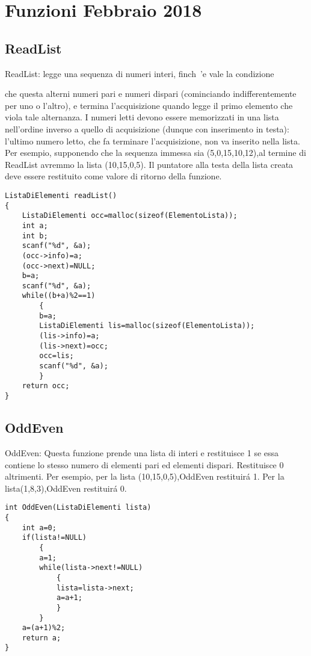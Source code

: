 \documentclass[a4paper,12pt,openany]{book}
\begin{document}
	\chapter{Funzioni Febbraio 2018}
  \section{ReadList}
 ReadList: 
 legge  una  sequenza  di  numeri  interi, 
  finch\ 'e  vale  la  condizione
  
    che  questa  alterni  numeri  pari  e  numeri  dispari  (cominciando indifferentemente per uno o l’altro),  e termina l’acquisizione quando legge il primo elemento che viola tale alternanza.  I numeri letti devono essere memorizzati in una lista nell’ordine inverso a quello di acquisizione (dunque con inserimento in testa):  l’ultimo numero letto, che fa terminare l’acquisizione, non va inserito nella lista. Per esempio, supponendo che la sequenza immessa sia (5,0,15,10,12),al termine di ReadList avremmo la lista (10,15,0,5).
Il  puntatore  alla  testa  della  lista  creata  deve  essere  restituito  come valore di ritorno della funzione.
   \begin{lstlisting}
ListaDiElementi readList()
{
	ListaDiElementi occ=malloc(sizeof(ElementoLista));
	int a;
	int b;
	scanf("%d", &a);
	(occ->info)=a;
	(occ->next)=NULL;
	b=a;
	scanf("%d", &a);
	while((b+a)%2==1)
		{
		b=a;
		ListaDiElementi lis=malloc(sizeof(ElementoLista));
		(lis->info)=a;
		(lis->next)=occ;
		occ=lis;
		scanf("%d", &a);
		}
	return occ;
} 
	\end{lstlisting}
  \section{OddEven}
  	OddEven:  Questa funzione prende una lista di interi e restituisce 1 se essa  contiene  lo  stesso  numero  di  elementi  pari  ed  elementi  dispari. Restituisce 0 altrimenti.
Per esempio, per la lista (10,15,0,5),OddEven restituir\'a 1.  Per la lista(1,8,3),OddEven restituir\'a 0.
	   \begin{lstlisting}
int OddEven(ListaDiElementi lista)
{
	int a=0;
	if(lista!=NULL)
		{
		a=1;
		while(lista->next!=NULL)
			{
			lista=lista->next;
			a=a+1;
			}
		}
	a=(a+1)%2;
	return a;
}
	\end{lstlisting}
\end{document}
